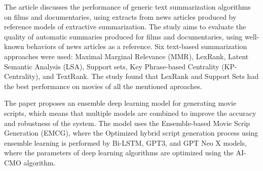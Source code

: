 \documentclass[fleqn,moreauthors,10pt]{ds_report}
\begin{document}
The article \cite{APARICIO20167} discusses the performance of generic text summarization algorithms on films and documentaries, using extracts from news articles produced by reference models of extractive summarization. The study aims to evaluate the quality of automatic summaries produced for films and documentaries, using well-known behaviors of news articles as a reference. Six text-based summarization approaches were used: Maximal Marginal Relevance (MMR), LexRank, Latent Semantic Analysis (LSA), Support sets, Key Phrase-based Centrality (KP-Centrality), and TextRank. The study found that LexRank and Support Sets had the best performance on movies of all the mentioned aproaches.

The paper \cite{DHARANIYA2023102150} proposes an ensemble deep learning model for generating movie scripts, which means that multiple models are combined to improve the accuracy and robustness of the system.  The model uses the Ensemble-based Movie Scrip Generation (EMCG), where the Optimized hybrid script generation process using ensemble learning is performed by Bi-LSTM, GPT3, and GPT Neo X models, where the parameters of deep learning algorithms are optimized using the AI-CMO algorithm.








 
\end{document}
